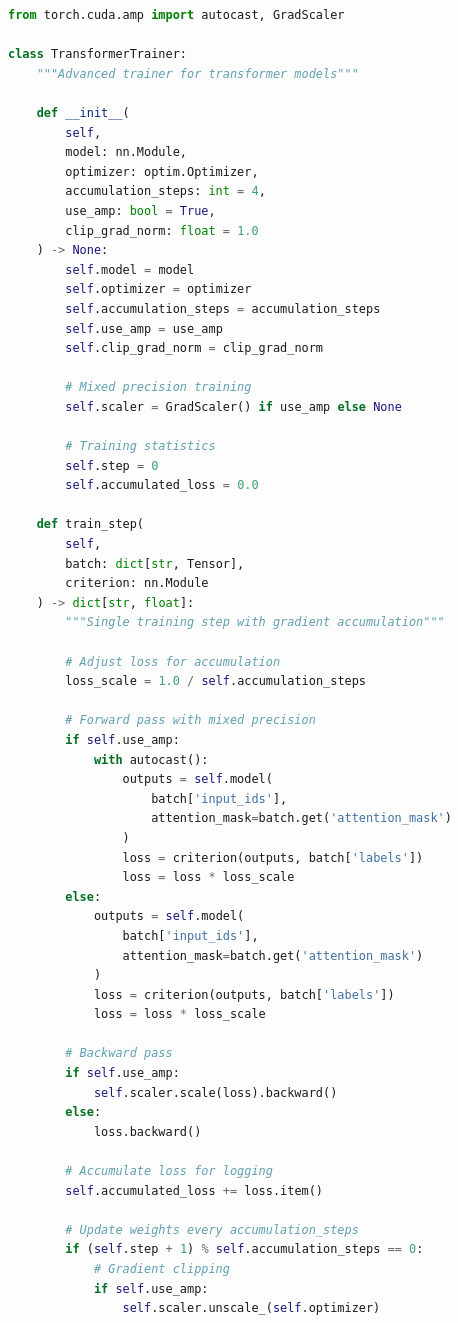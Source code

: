 \begin{lstlisting}[language=Python, caption=Gradient Accumulation with Mixed Precision]
from torch.cuda.amp import autocast, GradScaler

class TransformerTrainer:
    """Advanced trainer for transformer models"""

    def __init__(
        self,
        model: nn.Module,
        optimizer: optim.Optimizer,
        accumulation_steps: int = 4,
        use_amp: bool = True,
        clip_grad_norm: float = 1.0
    ) -> None:
        self.model = model
        self.optimizer = optimizer
        self.accumulation_steps = accumulation_steps
        self.use_amp = use_amp
        self.clip_grad_norm = clip_grad_norm

        # Mixed precision training
        self.scaler = GradScaler() if use_amp else None

        # Training statistics
        self.step = 0
        self.accumulated_loss = 0.0

    def train_step(
        self,
        batch: dict[str, Tensor],
        criterion: nn.Module
    ) -> dict[str, float]:
        """Single training step with gradient accumulation"""

        # Adjust loss for accumulation
        loss_scale = 1.0 / self.accumulation_steps

        # Forward pass with mixed precision
        if self.use_amp:
            with autocast():
                outputs = self.model(
                    batch['input_ids'],
                    attention_mask=batch.get('attention_mask')
                )
                loss = criterion(outputs, batch['labels'])
                loss = loss * loss_scale
        else:
            outputs = self.model(
                batch['input_ids'],
                attention_mask=batch.get('attention_mask')
            )
            loss = criterion(outputs, batch['labels'])
            loss = loss * loss_scale

        # Backward pass
        if self.use_amp:
            self.scaler.scale(loss).backward()
        else:
            loss.backward()

        # Accumulate loss for logging
        self.accumulated_loss += loss.item()

        # Update weights every accumulation_steps
        if (self.step + 1) % self.accumulation_steps == 0:
            # Gradient clipping
            if self.use_amp:
                self.scaler.unscale_(self.optimizer)


\end{lstlisting}
